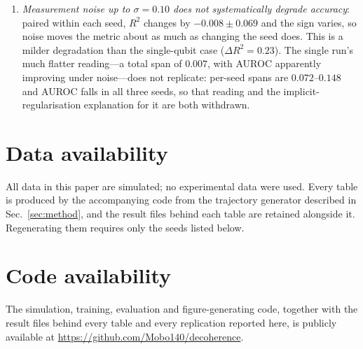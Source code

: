 \documentclass[twocolumn,10pt]{article}
\begin{document}
\begin{enumerate}
{    grows and then saturates}: $R^2 = 0.715 \pm 0.032$ at $J = 0.2$
    against $\approx 0.53$ for $J \geq 0.8$ (E7c, replicated across
    three seeds). A single sweep had suggested a dip localised at the
    quantum phase transition with recovery beyond it; neither the
    location nor the recovery reproduces, and $J = h$ is not
    distinguishable from its neighbours.
    The cause is open. This paper offered two explanations and tested
    both: that the dissipator couples the Hamiltonian's parity sectors
    (the Liouvillian in fact conserves parity exactly, at every $J$),
    and that a generic initial state superposes two comparable modes,
    one per sector (confining the state to a single sector does not
    reduce the decline---see Table~\ref{tab:r6}). Neither survives, so
    we report the trend as an empirical result whose mechanism is not
    established, rather than attach an account we have falsified.
  \item \emph{Measurement noise up to $\sigma = 0.10$ does not
    systematically degrade accuracy}: paired within each seed, $R^2$
    changes by $-0.008 \pm 0.069$ and the sign varies, so noise moves
    the metric about as much as changing the seed does. This is a
    milder degradation than the single-qubit case ($\Delta R^2 = 0.23$).
    The single run's much flatter reading---a total span of $0.007$,
    with AUROC apparently improving under noise---does not replicate:
    per-seed spans are $0.072$--$0.148$ and AUROC falls in all three
    seeds, so that reading and the implicit-regularisation explanation
    for it are both withdrawn.
\end{enumerate}

\section*{Data availability}
All data in this paper are simulated; no experimental data were used.
Every table is produced by the accompanying code from the trajectory
generator described in Sec.~\ref{sec:method}, and the result files behind
each table are retained alongside it.
Regenerating them requires only the seeds listed below.

\section*{Code availability}
The simulation, training, evaluation and figure-generating code, together
with the result files behind every table and every replication reported
here, is publicly available at
\url{https://github.com/Mobo140/decoherence}.
\end{document}
